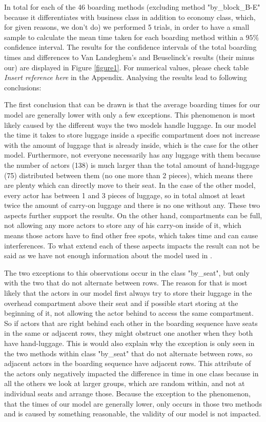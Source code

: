 \documentclass[11pt]{article}
\begin{document}
In total for each of the 46 boarding methods (excluding method "by\_block\_B-E" because it differentiates with business class in addition to economy class, which, for given reasons, we don't do) we performed 5 trials, in order to have a small sample to calculate the mean time taken for each boarding method within a $95\%$ confidence interval.
The results for the confidence intervals of the total boarding times and differences to Van Landeghem's and Beuselinck's results (their minus our) are displayed in Figure \ref{figure1}. For numerical values, please check table \textit{Insert reference here} in the Appendix.
Analysing the results lead to following conclusions:


The first conclusion that can be drawn is that the average boarding times for our model are generally lower with only a few exceptions. This phenomenon is most likely caused by the different ways the two models handle luggage. In our model the time it takes to store luggage inside a specific compartment does not increase with the amount of luggage that is already inside, which is the case for the other model. Furthermore, not everyone necessarily has any luggage with them because the number of actors (138) is much larger than the total amount of hand-luggage (75) distributed between them (no one more than 2 pieces), which means there are plenty which can directly move to their seat. In the case of the other model, every actor has between 1 and 3 pieces of luggage, so in total almost at least twice the amount of carry-on luggage and there is no one without any. These two aspects further support the results. On the other hand, compartments can be full, not allowing any more actors to store any of his carry-on inside of it, which means those actors have to find other free spots, which takes time and can cause interferences.  To what extend each of these aspects impacts the result can not be said as we have not enough information about the model used in \cite{beus}. 
	
The two exceptions to this observations occur in the class "by\_seat", but only with the two that do not alternate between rows. The reason for that is most likely that the actors in our model first always try to store their luggage in the overhead compartment above their seat and if possible start storing at the beginning of it, not allowing the actor behind to access the same compartment. So if actors that are right behind each other in the boarding sequence have seats in the same or adjacent rows, they might obstruct one another when they both have hand-luggage. This is would also explain why the exception is only seen in the two methods within class "by\_seat" that do not alternate between rows, so adjacent actors in the boarding sequence have adjacent rows. This attribute of the actors only negatively impacted the difference in time in one class because in all the others we look at larger groups, which are random within, and not at individual seats and arrange those. Because the exception to the phenomenon, that the times of our model are generally lower, only occurs in those two methods and is caused by something reasonable, the validity of our model is not impacted. 
\end{document}
